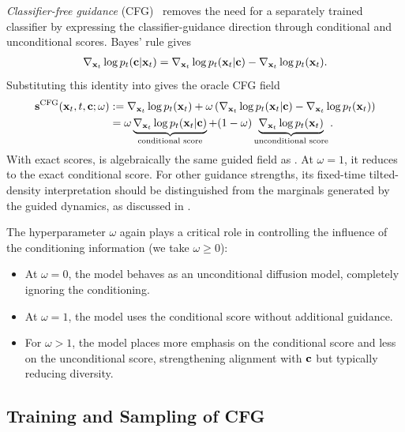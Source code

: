 \emph{Classifier-free guidance} (CFG)~\citep{ho2021classifier} removes the need
for a separately trained classifier by expressing the classifier-guidance
direction through conditional and unconditional scores. Bayes' rule gives
\begin{align}
\nabla_{{\mathbf{x}}_t}\log p_t({\mathbf{c}}|{\mathbf{x}}_t)
=
\nabla_{{\mathbf{x}}_t}\log p_t({\mathbf{x}}_t|{\mathbf{c}})
-
\nabla_{{\mathbf{x}}_t}\log p_t({\mathbf{x}}_t).
\end{align}
Substituting this identity into  gives the oracle CFG field
\begin{align}\label{eq:cfg-model}
{\mathbf{s}}^{\mathrm{CFG}}({\mathbf{x}}_t,t,{\mathbf{c}};\omega)
&:=
\nabla_{{\mathbf{x}}_t}\log p_t({\mathbf{x}}_t)
+
\omega
\left(
\nabla_{{\mathbf{x}}_t}\log p_t({\mathbf{x}}_t|{\mathbf{c}})
-
\nabla_{{\mathbf{x}}_t}\log p_t({\mathbf{x}}_t)
\right)
\nonumber\\
&=
\omega
\underbrace{\nabla_{{\mathbf{x}}_t}\log p_t({\mathbf{x}}_t|{\mathbf{c}})}_{\text{conditional score}}
+
(1-\omega)
\underbrace{\nabla_{{\mathbf{x}}_t}\log p_t({\mathbf{x}}_t)}_{\text{unconditional score}}.
\end{align}
With exact scores,  is algebraically the same guided field
as . At $\omega=1$, it reduces to the exact conditional
score. For other guidance strengths, its fixed-time tilted-density
interpretation should be distinguished from the marginals generated by the
guided dynamics, as discussed in
.

The hyperparameter $\omega$ again plays a critical role in controlling the influence of the conditioning information (we take $\omega \ge 0$):
\begin{itemize}
    \item At $\omega = 0$, the model behaves as an unconditional diffusion model, completely ignoring the conditioning.
    \item At $\omega = 1$, the model uses the conditional score without additional guidance.
    \item For $\omega > 1$, the model places more emphasis on the conditional score and less on the unconditional score, strengthening alignment with ${\mathbf{c}}$ but typically reducing diversity.
\end{itemize}

\subsection{Training and Sampling of CFG}


